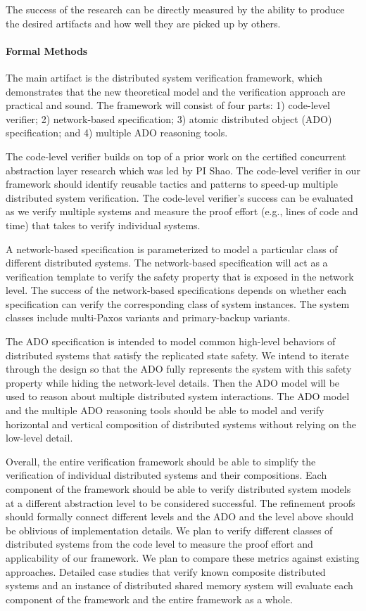 \documentclass[11pt]{article}
\begin{document}
The success of the research can be directly measured by the ability to
produce the desired artifacts and how well they are picked up by
others.

\paragraph{Formal Methods} The main artifact is the distributed system verification framework, 
which demonstrates that the new theoretical model and the verification
approach are practical and sound.  The framework will consist of four
parts: 1) code-level verifier; 2) network-based specification; 3)
atomic distributed object (ADO) specification; and 4) multiple ADO
reasoning tools.

The code-level verifier builds on top of a prior work on the certified
concurrent abstraction layer research which was led by PI Shao. The
code-level verifier in our framework should identify reusable tactics
and patterns to speed-up multiple distributed system verification. The
code-level verifier's success can be evaluated as we verify multiple
systems and measure the proof effort (e.g., lines of code and time)
that takes to verify individual systems.

A network-based specification is parameterized to model a particular
class of different distributed systems. The network-based
specification will act as a verification template to verify the safety
property that is exposed in the network level.  The success of the
network-based specifications depends on whether each specification can
verify the corresponding class of system instances.  The system
classes include multi-Paxos variants and primary-backup variants.

The ADO specification is intended to model common high-level behaviors
of distributed systems that satisfy the replicated state safety. We
intend to iterate through the design so that the ADO fully represents
the system with this safety property while hiding the network-level
details. Then the ADO model will be used to reason about multiple
distributed system interactions.  The ADO model and the multiple ADO
reasoning tools should be able to model and verify horizontal and
vertical composition of distributed systems without relying on the
low-level detail.

Overall, the entire verification framework should be able to simplify
the verification of individual distributed systems and their
compositions. Each component of the framework should be able to verify
distributed system models at a different abstraction level to be
considered successful. The refinement proofs should formally connect
different levels and the ADO and the level above should be oblivious
of implementation details. We plan to verify different classes of
distributed systems from the code level to measure the proof effort
and applicability of our framework. We plan to compare these metrics
against existing approaches.  Detailed case studies that verify known
composite distributed systems and an instance of distributed shared
memory system will evaluate each component of the framework and the
entire framework as a whole.
\end{document}
